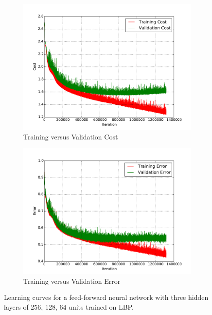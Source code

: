 \begin{figure}
	\centering
	\begin{subfigure}[b]{0.45\linewidth}
		\centering
		\includegraphics[width=\linewidth]{images/2/train_val_cost.pdf}
		\caption{Training versus Validation Cost}
	\end{subfigure}
	\hfill
	\begin{subfigure}[b]{0.45\linewidth}
		\centering
		\includegraphics[width=\linewidth]{images/2/train_val_error.pdf}
		\caption{Training versus Validation Error}
	\end{subfigure}
	\caption{Learning curves for a feed-forward neural network with three hidden layers of 256, 128, 64 units trained on LBP.} 
	\label{shrine2_curves}
\end{figure}
